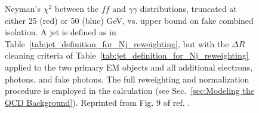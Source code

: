 \documentclass[dissertation.tex]{subfiles}
\begin{document}
\begin{figure}
	\caption{Neyman's $\chi^{2}$ between the $\mathit{ff}$ and $\gamma\gamma$ \MET distributions, truncated at either 25 (red) or 50 (blue) GeV, vs. upper bound on fake combined isolation.  A jet is defined as in Table~\ref{tab:jet_definition_for_Nj_reweighting}, but with the $\Delta R$ cleaning criteria of Table~\ref{tab:jet_definition_for_Nj_reweighting} applied to the two primary EM objects and all additional electrons, photons, and fake photons.  The full reweighting and normalization procedure is employed in the \MET calculation (see Sec.~\ref{sec:Modeling the QCD Background}).  Reprinted from Fig. 9 of ref. \cite{CMS_AN-2011-515}.}
	\label{fig:f_comb_iso_upper_bound_optimization}
\end{figure}
\end{document}
